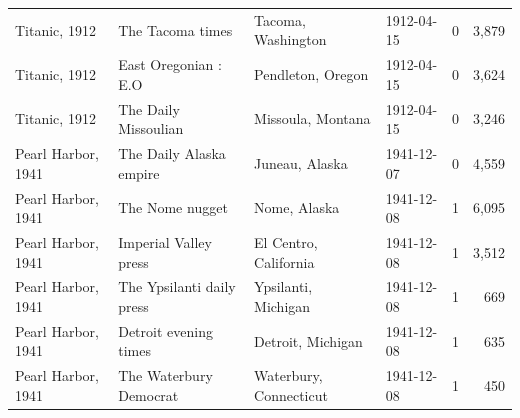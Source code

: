 \documentclass[11pt,a4paper]{article}
\begin{document}
{\begin{longtable}{p{2.6cm}p{4.6cm}p{3.6cm}lrr}
Titanic, 1912 & The Tacoma times & Tacoma, Washington & 1912-04-15 & 0 & 3,879\\
Titanic, 1912 & East Oregonian : E.O & Pendleton, Oregon & 1912-04-15 & 0 & 3,624\\
Titanic, 1912 & The Daily Missoulian & Missoula, Montana & 1912-04-15 & 0 & 3,246\\
\midrule
Pearl Harbor, 1941 & The Daily Alaska empire & Juneau, Alaska & 1941-12-07 & 0 & 4,559\\
Pearl Harbor, 1941 & The Nome nugget & Nome, Alaska & 1941-12-08 & 1 & 6,095\\
Pearl Harbor, 1941 & Imperial Valley press & El Centro, California & 1941-12-08 & 1 & 3,512\\
Pearl Harbor, 1941 & The Ypsilanti daily press & Ypsilanti, Michigan & 1941-12-08 & 1 & 669\\
Pearl Harbor, 1941 & Detroit evening times & Detroit, Michigan & 1941-12-08 & 1 & 635\\
Pearl Harbor, 1941 & The Waterbury Democrat & Waterbury, Connecticut & 1941-12-08 & 1 & 450\\\bottomrule\end{longtable}}
\end{document}
